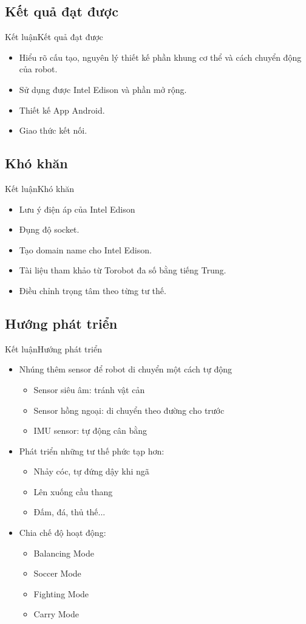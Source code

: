 \documentclass[compress, blue, 13pt,hyperref={pdfpagemode=FullScreen}]{beamer}
\begin{document}
\subsection{Kết quả đạt được}
\begin{frame}{Kết luận}{Kết quả đạt được}
\begin{itemize}
\item Hiểu rõ cấu tạo, nguyên lý thiết kế phần khung cơ thể và cách chuyển động của robot.
\item Sử dụng được Intel Edison và phần mở rộng.
\item Thiết kế App Android.
\item Giao thức kết nối.
\end{itemize}
\end{frame}
\subsection{Khó khăn}
\begin{frame}{Kết luận}{Khó khăn}
\begin{itemize}
\item Lưu ý điện áp của Intel Edison
\item Đụng độ socket.
\item Tạo domain name cho Intel Edison.
\item Tài liệu tham khảo từ Torobot đa số bằng tiếng Trung.
\item Điều chỉnh trọng tâm theo từng tư thế.
\end{itemize}
\end{frame}
\subsection{Hướng phát triển}
\begin{frame}{Kết luận}{Hướng phát triển}
\begin{itemize}
\item Nhúng thêm sensor để robot di chuyển một cách tự động
\begin{itemize}
\item Sensor siêu âm: tránh vật cản
\item Sensor hồng ngoại: di chuyển theo đường cho trước
\item IMU sensor: tự động cân bằng
\end{itemize}
\item Phát triển những tư thế phức tạp hơn:
\begin{itemize}
\item Nhảy cóc, tự đứng dậy khi ngã
\item Lên xuống cầu thang
\item Đấm, đá, thủ thế...
\end{itemize}
\item Chia chế độ hoạt động:
\begin{itemize}
\item Balancing Mode
\item Soccer Mode
\item Fighting Mode
\item Carry Mode
\end{itemize}
\end{itemize}
\end{frame}
\end{document}
